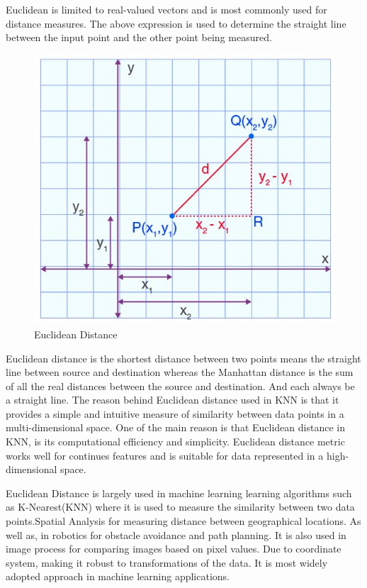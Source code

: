 \documentclass[conference]{IEEEtran}
\begin{document}
Euclidean is limited to real-valued vectors and is most commonly used for distance measures. The above expression is used to determine the straight line between the input point and the other point being measured. 


\begin{figure}
    \centering
    \includegraphics[width=0.7\linewidth]{EDistance.jpg}
    \caption{Euclidean Distance}
    \label{fig:enter-label}
\end{figure}


Euclidean distance is the shortest distance between two points means the straight line between source and destination whereas the Manhattan distance is the sum of all the real distances between the source and destination. And each always be a straight line. The reason behind Euclidean distance used in KNN is that it provides a simple and intuitive measure of similarity between data points in a multi-dimensional space. One of the main reason is that Euclidean distance in KNN, is its computational efficiency and simplicity. Euclidean distance metric works well for continues features and is suitable for data represented in a high-dimensional space. 



Euclidean Distance is largely used in machine learning learning algorithms such as K-Nearest(KNN) where it is used to measure the similarity between two data points.Spatial Analysis for measuring distance between geographical locations. As well as, in robotics for obstacle avoidance and path planning. It is also used in image process for comparing images based on pixel values. Due to coordinate system, making it robust to transformations of the data. It is most widely adopted approach in machine learning applications. 
\end{document}
